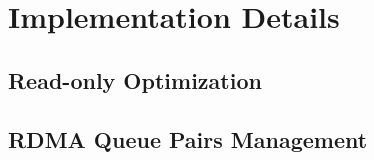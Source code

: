 % 
% 



\section{Implementation Details} \label{sec:impl}

\subsection{Read-only Optimization} \label{sec:readopt}


\subsection{RDMA Queue Pairs Management} \label{sec:qp}


